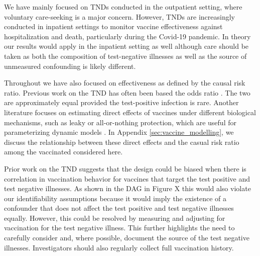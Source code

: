 \documentclass[11pt]{article}
\begin{document}
We have mainly focused on TNDs conducted in the outpatient setting, where voluntary care-seeking is a major concern. However, TNDs are increasingly conducted in inpatient settings to monitor vaccine effectiveness against hospitalization and death, particularly during the Covid-19 pandemic. In theory our results would apply in the inpatient setting as well although care should be taken as both the composition of test-negative illnesses as well as the source of unmeasured confounding is likely different. %

Throughout we have also focused on effectiveness as defined by the causal risk ratio. Previous work on the TND has often been based the odds ratio \cite{sullivan_theoretical_2016}. The two are approximately equal provided the test-positive infection is rare. Another literature focuses on estimating direct effects of vaccines under different biological mechanisms, such as leaky or all-or-nothing protection, which are useful for parameterizing dynamic models \cite{lewnard_measurement_2018,lewnard_theoretical_2021}. In Appendix \ref{sec:vaccine_modelling}, we discuss the relationship between these direct effects and the casual risk ratio among the vaccinated considered here.

Prior work on the TND suggests that the design could be biased when there is correlation in vaccination behavior for vaccines that target the test positive and test negative illnesses. As shown in the DAG in Figure X this would also violate our identifiability assumptions because it would imply the existence of a confounder that does not affect the test positive and test negative illnesses equally. However, this could be resolved by measuring and adjusting for vaccination for the test negative illness. This further highlights the need to carefully consider and, where possible, document the source of the test negative illnesses. Investigators should also regularly collect full vaccination history.

\newpage

\printbibliography
\end{document}

